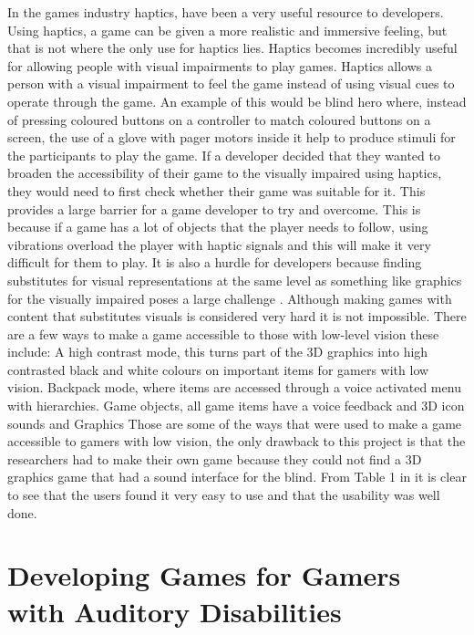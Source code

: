 \documentclass[11pt]{scrartcl}
\begin{document}
In the games industry haptics, have been a very useful resource to developers. Using haptics, a game can be given a more realistic and immersive feeling\cite{orozco2012role}, but that is not where the only use for haptics lies. 
Haptics becomes incredibly useful for allowing people with visual impairments to play games. Haptics allows a person with a visual impairment to feel the game instead of using visual cues to operate through the game. 
An example of this would be blind hero where, instead of pressing coloured buttons on a controller to match coloured buttons on a screen, the use of a glove with pager motors inside it help to produce stimuli for the participants to play the game.\cite{yuan2008blind}
If a developer decided that they wanted to broaden the accessibility of their game to the visually impaired using haptics, they would need to first check whether their game was suitable for it. This provides a large barrier for a game developer to try and overcome. This is because if a game has a lot of objects that the player needs to follow, using vibrations overload the player with haptic signals and this will make it very difficult for them to play\cite{orozco2012role}. 
It is also a hurdle for developers because finding substitutes for visual representations at the same level as something like graphics for the visually impaired poses a large challenge \cite{yuan2009towards}.
Although making games with content that substitutes visuals is considered very hard it is not impossible. There are a few ways to make a game accessible to those with low-level vision these include:
A high contrast mode, this turns part of the 3D graphics into high contrasted black and white colours on important items for gamers with low vision.
Backpack mode, where items are accessed through a voice activated menu with hierarchies.
Game objects, all game items have a voice feedback and 3D icon sounds and Graphics \cite{westin2004game}
Those are some of the ways that were used to make a game accessible to gamers with low vision, the only drawback to this project is that the researchers had to make their own game because they could not find a 3D graphics game that had a sound interface for the blind. From Table 1 in \cite{westin2004game} it is clear to see that the users found it very easy to use and that the usability was well done.


\section{Developing Games for Gamers with Auditory Disabilities}
\end{document}
